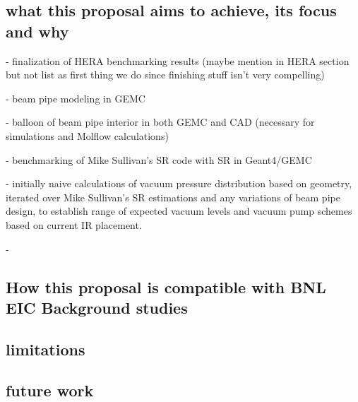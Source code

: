 \subsection{what this proposal aims to achieve, its focus and why}
- finalization of HERA benchmarking results (maybe mention in HERA section but not list as first thing we do since finishing stuff isn't very compelling)

- beam pipe modeling in GEMC

- balloon of beam pipe interior in both GEMC and CAD (necessary for simulations and Molflow calculations)

- benchmarking of Mike Sullivan's SR code with SR in Geant4/GEMC

- initially naive calculations of vacuum pressure distribution based on geometry, iterated over Mike Sullivan's SR estimations and any variations of beam pipe design, to establish range of expected vacuum levels and vacuum pump schemes based on current IR placement.

- 
  
\subsection{How this proposal is compatible with BNL EIC Background studies}

\subsection{limitations}

\subsection{future work}
